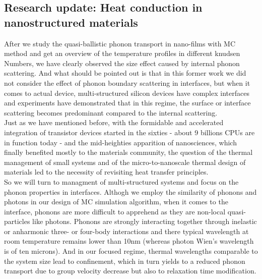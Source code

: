 \subsection{Research update: Heat conduction in nanostructured materials}  %
After we study the quasi-ballistic phonon transport in nano-films with MC method and get an overview of the temperature profiles in different 
knudsen Numbers, we have clearly observed the size effect caused by internal phonon scattering. And what should be pointed out is that in this former work we did not consider the effect of phonon boundary scattering in interfaces, but when it comes to actual device, multi-structured silicon devices have complex interfaces and experiments have demonstrated that in this regime, the surface or interface scattering becomes predominant compared to the internal scattering\cite{ChenRenkun,Hochbaum1}.\\
\indent Just as we have mentioned before, with the formidable and accelerated integration of transistor devices started in the sixties - about 9 billions CPUs are in function today - and the mid-heighties apparition of nanosciences, which finally benefited mostly to the materials
community, the question of the thermal management of small systems and of the micro-to-nanoscale thermal design of
materials led to the necessity of revisiting heat transfer principles\cite{Volz1}.
\\
\indent So we will turn to managment of multi-structured systems and focus on the phonon properties in interfaces. Althogh we employ the similarity of phonons and photons in our design of MC simulation algorithm, when it comes to the interface, phonons are more difficult to apprehend as they are non-local quasi-particles like photons\cite{zimanphonons}. Phonons
are strongly interacting together through inelastic or anharmonic three- or four-body interactions and there typical wavelength at room temperature remains lower than 10nm\cite{ChenRenkun} (whereas photon Wien’s wavelength is of ten microns). And in our focused regime, thermal wavelengths comparable to the system size lead to confinement, which in turn yields to a reduced phonon transport due to group velocity decrease but also to relaxation time modification\cite{kazan}.
